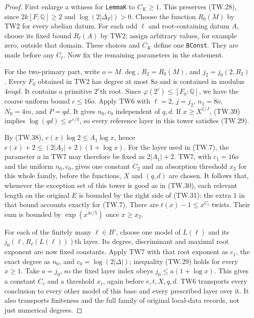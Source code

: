 \begin{proof}
First enlarge a witness for \texttt{LemmaK} to $C_K\ge1$.
This preserves (TW.28), since $2k[F:\mathbb Q]\ge2$ and
$\log(2|\Delta_F|)>0$.  Choose the function $R_0(M)$ by
TW2 for every abelian datum.  For each odd $\ell$ and
root-containing datum $A$, choose its fixed bound
$R_\ell(A)$ by TW2; assign arbitrary values, for example zero,
outside that domain.  These choices and $C_K$ define one
\texttt{BConst}.  They are made before any $C_t$.
Now fix the remaining parameters in the statement.

For the two-primary part, write $o=M.\deg$,
$R_2=R_0(M)$, and $j_2=j_0(2,R_2)$.
Every $F_0$ obtained in TW2 has degree at most $8o$ and is
contained in modulus $4mqd$.  It contains a primitive
$2^c$th root.  Since
$\varphi(2^c)\le[F_0:\mathbb Q]$, we have the coarse uniform
bound $c\le16o$.  Apply TW6 with
$\ell=2$, $j=j_2$, $n_1=8o$, $N_0=4m$, and $P=qd$.
It gives $n_0,c_0$ independent of $q,d$.
If $x\ge X^{1/J}$, (TW.39) implies
$\log(qd)\le x^{\varepsilon/4}$, so every reference layer
in this tower satisfies (TW.29).

By (TW.38),
$e(x)\log2\le A_1\log x$, hence
$e(x)+2\le(2|A_1|+2)(1+\log x)$.
For the layer used in (TW.7), the parameter $a$ in TW7 may
therefore be fixed as $2|A_1|+2$.
TW7, with $c_1=16o$ and the uniform $n_0,c_0$, gives one
constant $C_2$ and an absorption threshold $x_2$ for this
whole family, before the functions, $X$ and $(q,d)$ are
chosen.  It follows that, whenever the exception set of this
tower is good as in (TW.30), each relevant length on the
original $E$ is bounded by the right side of (TW.31):
the extra $1$ in that bound accounts exactly for (TW.7).
There are $t(x)-1\le x^{C_t}$ twists.  Their sum is bounded
by $\exp(x^{4\varepsilon/5})$ once $x\ge x_2$.

For each of the finitely many $\ell\in B'$, choose one model
of $L(\ell)$ and its $j_0(\ell,R_\ell(L(\ell)))$th layer.
Its degree, discriminant and maximal root exponent are now
fixed constants.  Apply TW7 with that root exponent as $c_1$,
the exact degree as $n_0$, and
$c_0=\log(2|\Delta|)$; inequality (TW.29) holds for every
$x\ge1$.  Take $a=j_0$, so the fixed layer index obeys
$j_0\le a(1+\log x)$.
This gives a constant $C_\ell$ and a threshold $x_\ell$,
again before $e,t,X,q,d$.  TW6 transports every conclusion
to every other model of this base and every prescribed layer
over it.  It also transports finiteness and the full family
of original local-data records, not just numerical degrees.


\end{proof}
